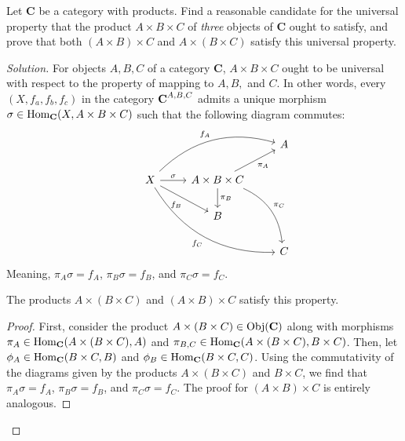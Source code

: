 \documentclass[12pt]{article}
\newenvironment{problem}[2][Problem]{\begin{trivlist}
\item[\hskip \labelsep {\bfseries #1}\hskip \labelsep {\bfseries #2.}]}{\end{trivlist}}
\newenvironment{proposition}[1][Proposition]{\begin{trivlist}
\item[\hskip \labelsep {\bfseries #1.}]}{\end{trivlist}}
\newcommand{\catname}[1]{\normalfont\textbf{#1}}
\newcommand{\catsup}[2]{\normalfont\textbf{#1}^{#2}}
\newcommand{\Hom}{\text{Hom}}
\newcommand{\Homc}[2]{\Hom_{\catname{#1}}(#2)}
\newcommand{\Objc}[1]{\text{Obj}(\catname{#1})}
\newenvironment{solution}
  {\renewcommand\qedsymbol{$\blacksquare$}\begin{proof}[Solution]}
{\end{proof}}
\begin{document}
\begin{problem}{5.9}
  Let \catname{C} be a category with products. Find a reasonable candidate for the universal property that the product 
  $A\times B\times C$ 
  of \textit{three} objects of \catname{C} ought to satisfy, and prove that both 
  $(A\times B)\times C$ and
  $A\times (B\times C)$ 
  satisfy this universal property.
\end{problem}
\begin{solution}
  For objects $A,B,C$ of a category \catname{C}, $A\times B\times C$ ought to be universal with respect to the property of mapping to $A, B,$ and $C$.
  In other words, every $(X, f_a, f_b, f_c)$ in the category $\catsup{C}{A,B,C}$ admits a unique morphism $\sigma \in \Homc{C}{X, A\times B\times C}$ such that the following diagram commutes:\\
  \[\begin{tikzcd}
    &&&A\\
    &X 
    \ar{r}{\sigma} 
    \ar[bend left]{urr}{f_A} 
    \ar[swap]{dr}{f_B}
    \ar[bend right, swap]{ddrr}{f_C}
    &A\times B\times C
    \ar[swap]{ur}{\pi_A}
    \ar{d}{\pi_B}
    \ar[bend left]{ddr}{\pi_C}
    &\\
    &&B&\\
    &&&C
\end{tikzcd}\]
Meaning, $\pi_A \sigma = f_A$, $\pi_B \sigma = f_B$, and $\pi_C \sigma = f_C$. \\
\begin{proposition}
  The products $A\times (B\times C)$ and $(A\times B)\times C$ satisfy this property.
\end{proposition}
\begin{proof}
  First, consider the product $A\times (B\times C)\in \Objc{C}$
  along with morphisms \\$\pi_A \in \Homc{C}{A\times (B\times C), A}$
and $\pi_{B,C} \in \Homc{C}{A\times (B\times C), B\times C}$.
Then, let \\$\phi_A \in \Homc{C}{B\times C, B}$ 
and $\phi_B \in \Homc{C}{B\times C, C}$. 
Using the commutativity of the diagrams given by the products
$A\times (B\times C)$ and $B\times C$, we find that 
  $\pi_A\sigma = f_A$,
  $\pi_B\sigma = f_B$, and
  $\pi_C\sigma = f_C$.
  The proof for $(A\times B)\times C$ is entirely analogous.
\end{proof}
\end{solution}
\end{document}
